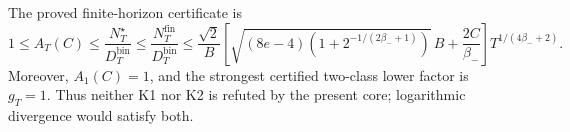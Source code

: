 The proved finite-horizon certificate is
\[
1\le A_T(C)\le\frac{N_T^\star}{D_T^{\mathrm{bin}}}\le\frac{N_T^{\mathrm{fin}}}{D_T^{\mathrm{bin}}}\le\frac{\sqrt2}{B}\left[\sqrt{(8e-4)\left(1+2^{-1/(2\beta_-+1)}\right)}\,B+\frac{2C}{\beta_-}\right]T^{1/(4\beta_-+2)}.
\]
Moreover, \(A_1(C)=1\), and the strongest certified two-class lower factor is \(g_T=1\). Thus neither K1 nor K2 is refuted by the present core; logarithmic divergence would satisfy both.